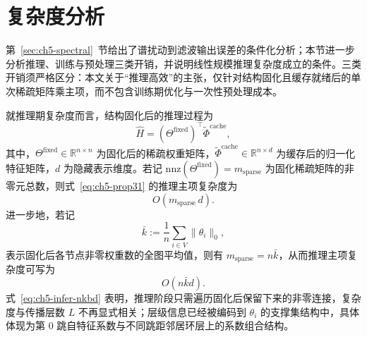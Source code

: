 

\section{复杂度分析}
\label{sec:ch5-time}

第~\ref{sec:ch5-spectral}~节给出了谱扰动到滤波输出误差的条件化分析；本节进一步分析推理、训练与预处理三类开销，并说明线性规模推理复杂度成立的条件。三类开销须严格区分：本文关于“推理高效”的主张，仅针对结构固化且缓存就绪后的单次稀疏矩阵乘主项，而不包含训练期优化与一次性预处理成本。

就推理期复杂度而言，结构固化后的推理过程为
\begin{equation}
  \hat{H} = (\Theta^{\text{fixed}})^\top \tilde{\Phi}^{\text{cache}},
  \label{eq:ch5-prop31}
\end{equation}
其中，$\Theta^{\text{fixed}}\in\mathbb{R}^{n\times n}$ 为固化后的稀疏权重矩阵，$\tilde{\Phi}^{\text{cache}}\in\mathbb{R}^{n\times d}$ 为缓存后的归一化特征矩阵，$d$ 为隐藏表示维度。若记 $\mathrm{nnz}(\Theta^{\text{fixed}})=m_{\text{sparse}}$ 为固化稀疏矩阵的非零元总数，则式~\eqref{eq:ch5-prop31} 的推理主项复杂度为
\begin{equation}
  O(m_{\text{sparse}}\,d).
  \label{eq:ch5-infer-msparse}
\end{equation}
进一步地，若记
\begin{equation}
  \bar{k}
  :=
  \frac{1}{n}\sum_{i\in V}\|\theta_i\|_0,
  \label{eq:ch5-kbar-time}
\end{equation}
表示固化后各节点非零权重数的全图平均值，则有 $m_{\text{sparse}}=n\bar{k}$，从而推理主项复杂度可写为
\begin{equation}
  O(n\bar{k}d).
  \label{eq:ch5-infer-nkbd}
\end{equation}
式~\eqref{eq:ch5-infer-nkbd} 表明，推理阶段只需遍历固化后保留下来的非零连接，复杂度与传播层数 $L$ 不再显式相关；层级信息已经被编码到 $\theta_i$ 的支撑集结构中，具体体现为第 $0$ 跳自特征系数与不同跳距邻居环层上的系数组合结构。

